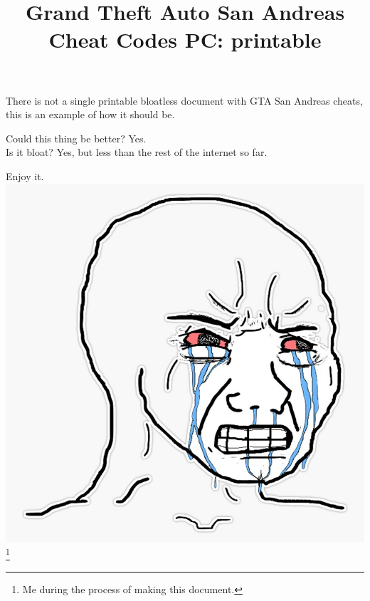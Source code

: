 \documentclass{article}
\title{Grand Theft Auto San Andreas Cheat Codes PC: printable}
\date{}
\begin{document}
\maketitle
{}
There is not a single printable bloatless document with GTA San Andreas cheats,
this is an example of how it should be.

Could this thing be better?
Yes.
\\
Is it bloat?
Yes, but less than the rest of the internet so far.

Enjoy it.
\\
\includegraphics[scale=0.3]{wojack.jpg}\footnote{Me during the process of making this document.}
\pagebreak
\\
\end{document}
